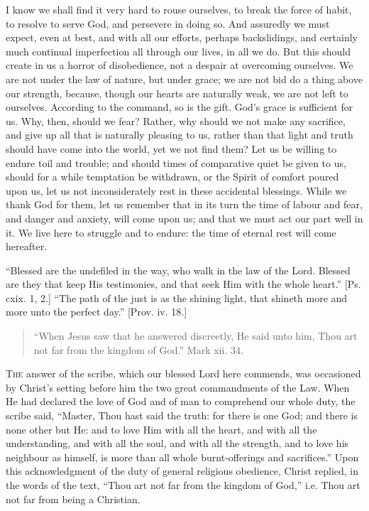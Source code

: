 I know we shall find it very hard to rouse ourselves, to break the
force of habit, to resolve to serve God, and persevere in doing so.
And assuredly we must expect, even at best, and with all our efforts,
perhaps backslidings, and certainly much continual imperfection all
through our lives, in all we do. But this should create in us a horror
of disobedience, not a despair at overcoming ourselves. We are not
under the law of nature, but under grace; we are not bid do a thing
above our strength, because, though our hearts are naturally weak, we
are not left to ourselves. According to the command, so is the gift.
God's grace is sufficient for us. Why, then, should we fear? Rather,
why should we not make any sacrifice, and give up all that is
naturally pleasing to us, rather than that light and truth should have
come into the world, yet we not find them? Let us be willing to endure
toil and trouble; and should times of comparative quiet be given to
us, should for a while temptation be withdrawn, or the Spirit of
comfort poured upon us, let us not inconsiderately rest in these
accidental blessings. While we thank God for them, let us remember
that in its turn the time of labour and fear, and danger and anxiety,
will come upon us; and that we must act our part well in it. We live
here to struggle and to endure: the time of eternal rest will come
hereafter.

``Blessed are the undefiled in the way, who walk in the law of
the Lord. Blessed are they that keep His testimonies, and that seek
Him with the whole heart.'' [Ps. cxix. 1, 2.] ``The path of
the just is as the shining light, that shineth more and more unto the
perfect day.'' [Prov. iv. 18.]


\begin{quote}

``When Jesus saw that he answered discreetly, He said unto
him, Thou art not far from the kingdom of God.'' Mark xii. 34.

\end{quote}

T\textsc{he} answer of the scribe, which our blessed Lord here commends, was
occasioned by Christ's setting before him the two great commandments
of the Law. When He had declared the love of God and of man to
comprehend our whole duty, the scribe said, ``Master, Thou hast
said the truth: for there is one God; and there is none other but He:
and to love Him with all the heart, and with all the understanding,
and with all the soul, and with all the strength, and to love his
neighbour as himself, is more than all whole burnt-offerings and
sacrifices.'' Upon this acknowledgment of the duty of general
religious obedience, Christ replied, in the words of the text,
``Thou art not far from the kingdom of God,'' i.e. Thou art
not far from being a Christian.

